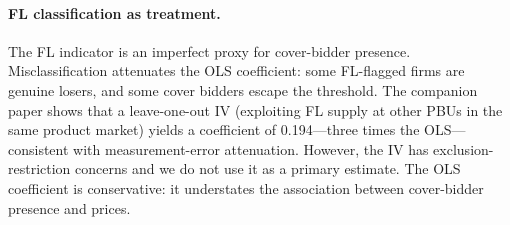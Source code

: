 \paragraph{FL classification as treatment.}
The FL indicator is an imperfect proxy for cover-bidder presence.
Misclassification attenuates the OLS coefficient: some FL-flagged
firms are genuine losers, and some cover bidders escape the
threshold. The companion paper shows that a leave-one-out IV
(exploiting FL supply at other PBUs in the same product market)
yields a coefficient of 0.194---three times the OLS---consistent
with measurement-error attenuation. However, the IV has
exclusion-restriction concerns and we do not use it as a primary
estimate. The OLS coefficient is conservative: it understates the
association between cover-bidder presence and prices.
